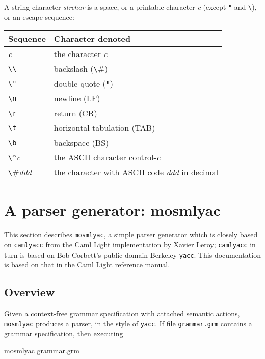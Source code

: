 \documentclass[fleqn]{article}
\begin{document}
\noindent A string character {\it strchar\/} is a space, or a
printable character {\it c\/} (except {\tt "} and \verb#\#), or an
escape sequence:

\begin{quot}
\begin{tabular}{@{}|l|l|}\hline
Sequence & Character denoted \\\hline
{\it c\/}       & the character {\it c\/}\\
\verb#\\#       & backslash (\verb#\#)\\
\verb#\"#       & double quote (\verb#"#)\\
\verb#\n#       & newline (LF)\\
\verb#\r#       & return (CR)\\
\verb#\t#       & horizontal tabulation (TAB)\\
\verb#\b#       & backspace (BS)\\
\verb#\^#{\it c\/}      & the ASCII character control-{\it c\/}\\
\verb#\#{\it ddd\/}     & the character with ASCII code {\it ddd\/} in
decimal\\\hline 
\end{tabular}
\end{quot}

\newpage

\section{A parser generator: mosmlyac}
\label{sec-mosmlyac}

This section describes {\tt mosmlyac}, a simple parser generator which
is closely based on {\tt camlyacc} from the Caml Light implementation
by Xavier Leroy; {\tt camlyacc} in turn is based on Bob Corbett's
public domain Berkeley {\tt yacc}.  This documentation is based on
that in the Caml Light reference manual.


\subsection{Overview}

Given a context-free grammar specification with attached semantic
actions, {\tt mosmlyac} produces a parser, in the style of {\tt yacc}.
If file {\tt grammar.grm} contains a grammar specification, then
executing

\begin{program}
mosmlyac grammar.grm  
\end{program}
\end{document}

